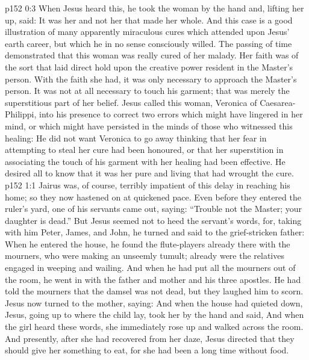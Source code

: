 \vs p152 0:3 When Jesus heard this, he took the woman by the hand and, lifting her up, said:  It was her  and not her  that made her whole. And this case is a good illustration of many apparently miraculous cures which attended upon Jesus’ earth career, but which he in no sense consciously willed. The passing of time demonstrated that this woman was really cured of her malady. Her faith was of the sort that laid direct hold upon the creative power resident in the Master’s person. With the faith she had, it was only necessary to approach the Master’s person. It was not at all necessary to touch his garment; that was merely the superstitious part of her belief. Jesus called this woman, Veronica of Caesarea\hyp{}Philippi, into his presence to correct two errors which might have lingered in her mind, or which might have persisted in the minds of those who witnessed this healing: He did not want Veronica to go away thinking that her fear in attempting to steal her cure had been honoured, or that her superstition in associating the touch of his garment with her healing had been effective. He desired all to know that it was her pure and living  that had wrought the cure.
\vs p152 1:1 Jairus was, of course, terribly impatient of this delay in reaching his home; so they now hastened on at quickened pace. Even before they entered the ruler’s yard, one of his servants came out, saying: “Trouble not the Master; your daughter is dead.” But Jesus seemed not to heed the servant’s words, for, taking with him Peter, James, and John, he turned and said to the grief\hyp{}stricken father:  When he entered the house, he found the flute\hyp{}players already there with the mourners, who were making an unseemly tumult; already were the relatives engaged in weeping and wailing. And when he had put all the mourners out of the room, he went in with the father and mother and his three apostles. He had told the mourners that the damsel was not dead, but they laughed him to scorn. Jesus now turned to the mother, saying:  And when the house had quieted down, Jesus, going up to where the child lay, took her by the hand and said,  And when the girl heard these words, she immediately rose up and walked across the room. And presently, after she had recovered from her daze, Jesus directed that they should give her something to eat, for she had been a long time without food.

